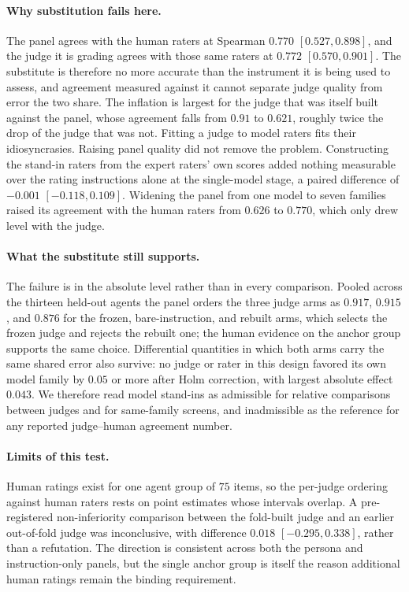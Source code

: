 \paragraph{Why substitution fails here.}
The panel agrees with the human raters at Spearman $0.770$ $[0.527, 0.898]$, and the judge it is grading agrees with those same raters at $0.772$ $[0.570, 0.901]$.
The substitute is therefore no more accurate than the instrument it is being used to assess, and agreement measured against it cannot separate judge quality from error the two share.
The inflation is largest for the judge that was itself built against the panel, whose agreement falls from $0.91$ to $0.621$, roughly twice the drop of the judge that was not.
Fitting a judge to model raters fits their idiosyncrasies.
Raising panel quality did not remove the problem.
Constructing the stand-in raters from the expert raters' own scores added nothing measurable over the rating instructions alone at the single-model stage, a paired difference of $-0.001$ $[-0.118, 0.109]$.
Widening the panel from one model to seven families raised its agreement with the human raters from $0.626$ to $0.770$, which only drew level with the judge.

\paragraph{What the substitute still supports.}
The failure is in the absolute level rather than in every comparison.
Pooled across the thirteen held-out agents the panel orders the three judge arms as $0.917$, $0.915$, and $0.876$ for the frozen, bare-instruction, and rebuilt arms, which selects the frozen judge and rejects the rebuilt one; the human evidence on the anchor group supports the same choice.
Differential quantities in which both arms carry the same shared error also survive: no judge or rater in this design favored its own model family by $0.05$ or more after Holm correction, with largest absolute effect $0.043$.
We therefore read model stand-ins as admissible for relative comparisons between judges and for same-family screens, and inadmissible as the reference for any reported judge--human agreement number.

\paragraph{Limits of this test.}
Human ratings exist for one agent group of $75$ items, so the per-judge ordering against human raters rests on point estimates whose intervals overlap.
A pre-registered non-inferiority comparison between the fold-built judge and an earlier out-of-fold judge was inconclusive, with difference $0.018$ $[-0.295, 0.338]$, rather than a refutation.
The direction is consistent across both the persona and instruction-only panels, but the single anchor group is itself the reason additional human ratings remain the binding requirement.
